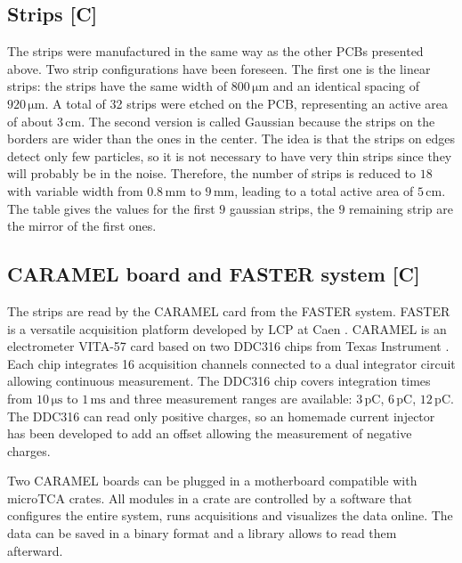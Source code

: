 \begin{refsection}
  \subsection{Strips [C]}
  The strips were manufactured in the same way as the other PCBs presented above. Two strip configurations have been foreseen. The first one is the linear strips: the strips have the same width of $800\,\mathrm{\mu m}$ and an identical spacing of $920\,\mathrm{\mu m}$. A total of 32 strips were etched on the PCB, representing an active area of about $3\,\mathrm{cm}$. The second version is called Gaussian because the strips on the borders are wider than the ones in the center. The idea is that the strips on edges detect only few particles, so it is not necessary to have very thin strips since they will probably be in the noise. Therefore, the number of strips is reduced to $18$ with variable width from $0.8\,\mathrm{mm}$ to $9\,\mathrm{mm}$, leading to a total active area of $5\,\mathrm{cm}$. The table gives the values for the first $9$ gaussian strips, the $9$ remaining strip are the mirror of the first ones.

  

  \subsection{CARAMEL board and FASTER system [C]}

  The strips are read by the CARAMEL card \cite{caramel2013} from the FASTER system. FASTER is a versatile  acquisition platform developed by LCP at Caen \cite{faster2013}. CARAMEL is an electrometer VITA-57 card based on two DDC316 chips from Texas Instrument \cite{ddc316}. Each chip integrates 16 acquisition channels connected to a dual integrator circuit allowing continuous measurement. The DDC316 chip covers integration times from $10\,\mathrm{\mu s}$ to $1\,\mathrm{ms}$ and three measurement ranges are available: $3\,\mathrm{pC}$, $6\,\mathrm{pC}$, $12\,\mathrm{pC}$. The DDC316 can read only positive charges, so an homemade current injector has been developed to add an offset allowing the measurement of negative charges.
  

  Two CARAMEL boards can be plugged in a motherboard compatible with microTCA crates. All modules in a crate are controlled by a software that configures the entire system, runs acquisitions and visualizes \cite{rhb2012} the data online. The data can be saved in a binary format and a library allows to read them afterward.


\end{refsection}
